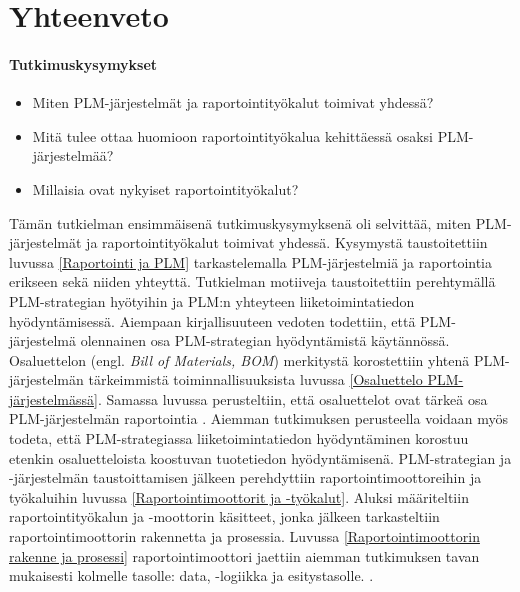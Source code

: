 \chapter{Yhteenveto} \label{Yhteenveto}

\subsubsection{Tutkimuskysymykset}
\begin{itemize}
\item Miten PLM-järjestelmät ja raportointityökalut toimivat yhdessä?
\item Mitä tulee ottaa huomioon raportointityökalua kehittäessä osaksi PLM-järjestelmää?
\item Millaisia ovat nykyiset raportointityökalut?
\end{itemize}


Tämän tutkielman ensimmäisenä tutkimuskysymyksenä oli selvittää, miten PLM-järjestelmät ja raportointityökalut toimivat yhdessä. Kysymystä taustoitettiin luvussa \ref{Raportointi ja PLM} tarkastelemalla PLM-järjestelmiä ja raportointia erikseen sekä niiden yhteyttä. Tutkielman motiiveja taustoitettiin perehtymällä PLM-strategian hyötyihin ja PLM:n yhteyteen liiketoimintatiedon hyödyntämisessä. Aiempaan kirjallisuuteen vedoten todettiin, että PLM-järjestelmä olennainen osa PLM-strategian hyödyntämistä käytännössä.\cite{alemanni_key_2008} Osaluettelon (engl. \textit{Bill of Materials, BOM}) merkitystä korostettiin yhtenä PLM-järjestelmän tärkeimmistä toiminnallisuuksista\cite{david_what_2016} luvussa \ref{Osaluettelo PLM-järjestelmässä}. Samassa luvussa perusteltiin, että osaluettelot ovat tärkeä osa PLM-järjestelmän raportointia \cite{german_challenge_2016}. Aiemman tutkimuksen perusteella voidaan myös todeta, että PLM-strategiassa liiketoimintatiedon hyödyntäminen korostuu etenkin osaluetteloista koostuvan tuotetiedon hyödyntämisenä. \cite{bayro-corrochano_preliminary_2014}  PLM-strategian ja -järjestelmän taustoittamisen jälkeen perehdyttiin raportointimoottoreihin ja työkaluihin luvussa \ref{Raportointimoottorit ja -työkalut}. Aluksi määriteltiin raportointityökalun ja -moottorin käsitteet, jonka jälkeen tarkasteltiin raportointimoottorin rakennetta ja prosessia. Luvussa \ref{Raportointimoottorin rakenne ja prosessi} raportointimoottori jaettiin aiemman tutkimuksen tavan mukaisesti kolmelle tasolle: data, -logiikka ja esitystasolle. \cite{he_design_2010}.

